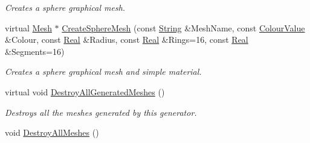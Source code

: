 \begin{DoxyCompactItemize}
\begin{DoxyCompactList}\small\item\em Creates a sphere graphical mesh. \item\end{DoxyCompactList}\item 
virtual \hyperlink{classMezzanine_1_1Mesh}{Mesh} $\ast$ \hyperlink{classMezzanine_1_1MeshManager_a1373def36d801ef524372c76852984ec}{CreateSphereMesh} (const \hyperlink{namespaceMezzanine_acf9fcc130e6ebf08e3d8491aebcf1c86}{String} \&MeshName, const \hyperlink{classMezzanine_1_1ColourValue}{ColourValue} \&Colour, const \hyperlink{namespaceMezzanine_a726731b1a7df72bf3583e4a97282c6f6}{Real} \&Radius, const \hyperlink{namespaceMezzanine_a726731b1a7df72bf3583e4a97282c6f6}{Real} \&Rings=16, const \hyperlink{namespaceMezzanine_a726731b1a7df72bf3583e4a97282c6f6}{Real} \&Segments=16)
\begin{DoxyCompactList}\small\item\em Creates a sphere graphical mesh and simple material. \item\end{DoxyCompactList}\item 
\hypertarget{classMezzanine_1_1MeshManager_ad6ef502c838312f778c5ca77c706f20d}{
virtual void \hyperlink{classMezzanine_1_1MeshManager_ad6ef502c838312f778c5ca77c706f20d}{DestroyAllGeneratedMeshes} ()}
\label{classMezzanine_1_1MeshManager_ad6ef502c838312f778c5ca77c706f20d}

\begin{DoxyCompactList}\small\item\em Destroys all the meshes generated by this generator. \item\end{DoxyCompactList}\item 
\hypertarget{classMezzanine_1_1MeshManager_aa807f17cbba66ff45f8ffd5d027dec7e}{
void \hyperlink{classMezzanine_1_1MeshManager_aa807f17cbba66ff45f8ffd5d027dec7e}{DestroyAllMeshes} ()}
\label{classMezzanine_1_1MeshManager_aa807f17cbba66ff45f8ffd5d027dec7e}


\end{DoxyCompactItemize}
